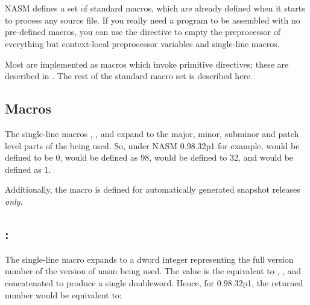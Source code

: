\chapter{}
\label{ch:stdmac}

NASM defines a set of standard macros, which are already defined
when it starts to process any source file. If you really need a
program to be assembled with no pre-defined macros, you can use the
 directive to empty the preprocessor of everything
but context-local preprocessor variables and single-line macros.

Most  are implemented as macros
which invoke primitive directives; these are described in .
The rest of the standard macro set is described here.

\section{ Macros}
\label{sec:stdmacver}

The single-line macros , ,
 and  expand to
the major, minor, subminor and patch level parts of the  being used. So, under NASM 0.98.32p1 for example, 
would be defined to be 0,  would be defined as 98,
 would be defined to 32, and 
would be defined as 1.

Additionally, the macro  is defined for
automatically generated snapshot releases \emph{only}.

\section{: }
\label{sec:stdmacverid}

The single-line macro  expands to a dword integer
representing the full version number of the version of nasm being used.
The value is the equivalent to , ,
 and  concatenated to
produce a single doubleword. Hence, for 0.98.32p1, the returned number
would be equivalent to:

